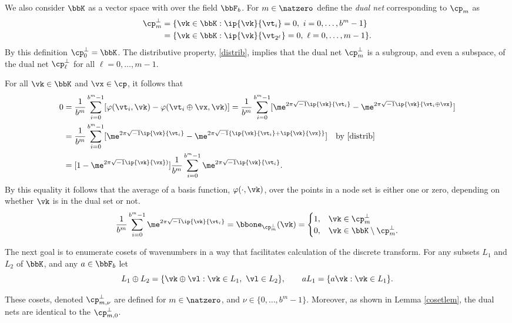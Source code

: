 \documentclass[]{elsarticle}
\theoremstyle{definition}
\begin{document}
We also consider $\bbK$ as a vector space with over the field $\bbF_b$.  For $m \in \natzero$ define the \emph{dual net} corresponding to $\cp_m$ as  
\begin{align*}
\cp^{\perp}_m &= \{\vk \in \bbK : \ip{\vk}{\vt_i} = 0, \ i=0, \ldots, b^m-1\} \\
&= \{\vk \in \bbK : \ip{\vk}{\vt_{2^{\ell}}} = 0, \ \ell=0, \ldots, m-1\}.
\end{align*}
By this definition $\cp^{\perp}_{0}=\bbK$.  The distributive property, \eqref{distrib}, implies that the dual net $\cp^{\perp}_m$ is a subgroup, and even a subspace, of the dual net $\cp^{\perp}_\ell$ for all $\ell=0, \ldots, m-1$.

For all $\vk \in \bbK$ and $\vx \in \cp$, it follows that
\begin{align*} 
\nonumber
0 & = \frac{1}{b^m} \sum_{i=0}^{b^m-1} [\varphi(\vt_i,\vk) - \varphi(\vt_i \oplus \vx,\vk)]  
= \frac{1}{b^m} \sum_{i=0}^{b^m-1} [\me^{2 \pi \sqrt{-1} \ip{\vk}{\vt_i}} - \me^{2 \pi \sqrt{-1} \ip{\vk}{\vt_i \oplus \vx}}]\\
\nonumber
& = \frac{1}{b^m} \sum_{i=0}^{b^m-1} [\me^{2 \pi \sqrt{-1} \ip{\vk}{\vt_i}} - \me^{2 \pi \sqrt{-1} \{\ip{\vk}{\vt_i}+\ip{\vk}{\vx}\}}] \quad \text{by } \eqref{distrib}\\
\label{sumeq}
& = [1 - \me^{2 \pi \sqrt{-1} \ip{\vk}{\vx})}] \frac{1}{b^m} \sum_{i=0}^{b^m-1}  \me^{2 \pi \sqrt{-1} \ip{\vk}{\vt_i}}.
\end{align*}
By this equality it follows that the average of a basis function, $\varphi(\cdot,\vk)$, over the points in a node set is either one or zero, depending on whether $\vk$ is in the dual set or not.
\begin{equation*}
\frac{1}{b^m} \sum_{i=0}^{b^m-1}  \me^{2 \pi \sqrt{-1} \ip{\vk}{\vt_i}} = \bbone_{\cp_m^{\perp}}(\vk) = \begin{cases} 1 , & \vk \in \cp_m^{\perp}\\
 0,  & \vk \in \bbK \setminus \cp_m^{\perp}.
 \end{cases}
\end{equation*}

The next goal is to enumerate cosets of wavenumbers in a way that facilitates calculation of the discrete transform.  For any subsets $L_1$ and $L_2$ of $\bbK$, and any $a \in \bbF_b$ let
\[
L_1 \oplus L_2 = \{\vk \oplus \vl : \vk \in L_1, \ \vl \in L_2\}, \qquad a L_1 = \{a \vk : \vk \in L_1\}. 
\]


These cosets, denoted $\cp_{m,\nu}^{\perp}$ are defined for $m\in \natzero$, and $\nu \in \{0, \ldots, b^m-1\}$.  Moreover, as shown in Lemma \ref{cosetlem}, the dual nets are identical to the $\cp_{m,0}^{\perp}$.
\end{document}

